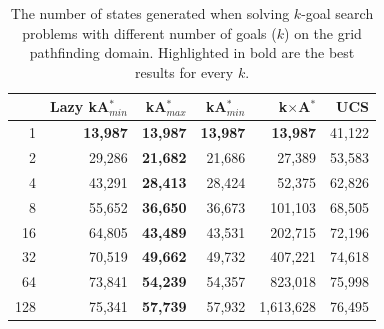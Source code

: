 \documentclass{aicom2e}
\newcommand{\kgs}{$k$-goal search}
\newcommand{\kastarmin}{kA$^*_{min}$}
\newcommand{\kastarmax}{kA$^*_{max}$}
\newcommand{\kxastar}{k$\times$A$^*$}
\begin{document}

\begin{table}[]
    \centering
    \begin{tabular}{|r|r|r|r|r|r|}
    \hline
        & \multicolumn{1}{c|}{Lazy \kastarmin{}} & \kastarmax &      \kastarmin       &  \kxastar & UCS       \\

        \hline
1                         & \textbf{13,987}                      & \textbf{13,987}           & \textbf{13,987}           & \textbf{13,987}                 & 41,122                      \\
2                         & 29,286                               & \textbf{21,682}           & 21,686                    & 27,389                          & 53,583                      \\
4                         & 43,291                               & \textbf{28,413}           & 28,424                    & 52,375                          & 62,826                      \\
8                         & 55,652                               & \textbf{36,650}           & 36,673                    & 101,103                         & 68,505                      \\
16                        & 64,805                               & \textbf{43,489}           & 43,531                    & 202,715                         & 72,196                      \\
32                        & 70,519                               & \textbf{49,662}           & 49,732                    & 407,221                         & 74,618                      \\
64                        & 73,841                               & \textbf{54,239}           & 54,357                    & 823,018                         & 75,998                      \\
128                       & 75,341                               & \textbf{57,739}           & 57,932                    & 1,613,628                       & 76,495\\
\hline
    \end{tabular}
    \caption{The number of states generated when solving \kgs{} problems with different number of goals ($k$) on the grid pathfinding domain. Highlighted in bold are the best results for every $k$.}
    \label{tab:pathfinding-generated}
\end{table}
\end{document}
